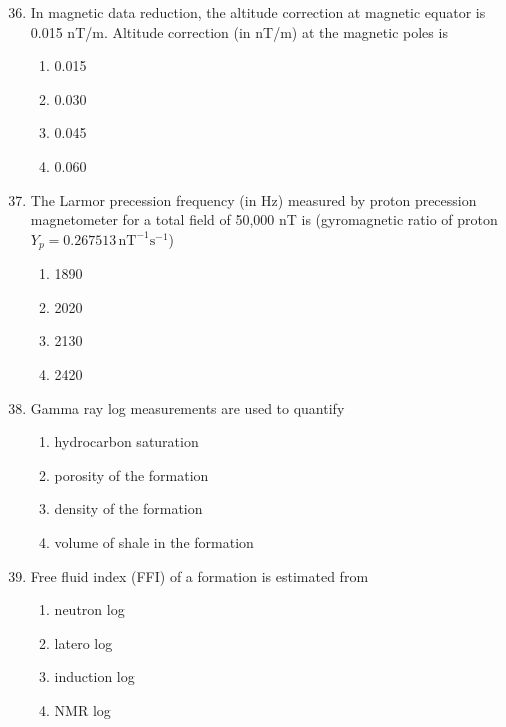 \documentclass[journal,12pt,onecolumn]{IEEEtran}
\theoremstyle{remark}
\begin{document}
\begin{enumerate}
\setcounter{enumi}{35}

\item In magnetic data reduction, the altitude correction at magnetic equator is 0.015 nT/m. Altitude correction (in nT/m) at the magnetic poles is  
\begin{multicols}{4}
\begin{enumerate}
\item 0.015  
\item 0.030  
\item 0.045  
\item 0.060  
\end{enumerate}
\end{multicols}

\item The Larmor precession frequency (in Hz) measured by proton precession magnetometer for a total field of 50,000 nT is (gyromagnetic ratio of proton \(Y_p = 0.267513 \, \text{nT}^{-1}\text{s}^{-1}\))  
\begin{multicols}{4}
\begin{enumerate}
\item 1890  
\item 2020  
\item 2130  
\item 2420  
\end{enumerate}
\end{multicols}

\item Gamma ray log measurements are used to quantify  
\begin{enumerate}
\item hydrocarbon saturation  
\item porosity of the formation  
\item density of the formation  
\item volume of shale in the formation  
\end{enumerate}

\item Free fluid index (FFI) of a formation is estimated from  
\begin{multicols}{4}
\begin{enumerate}
\item neutron log  
\item latero log  
\item induction log  
\item NMR log  
\end{enumerate}
\end{multicols}


\end{enumerate}
\end{document}
